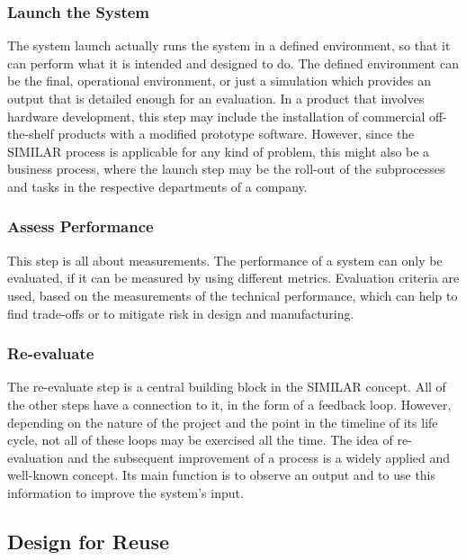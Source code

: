 \subsubsection{Launch the System}

\hspace{5mm} The system launch actually runs the system in a defined environment, so that it can perform what it is intended and designed to do.
The defined environment can be the final, operational environment, or just a simulation which provides an output that is detailed enough for an evaluation.
In a product that involves hardware development, this step may include the installation of commercial off-the-shelf products with a modified prototype software.
However, since the SIMILAR process is applicable for any kind of problem, this might also be a business process, where the launch step may be the roll-out of the subprocesses and tasks in the respective departments of a company.

\subsubsection{Assess Performance}

\hspace{5mm} This step is all about measurements.
The performance of a system can only be evaluated, if it can be measured by using different metrics.
Evaluation criteria are used, based on the measurements of the technical performance, which can help to find trade-offs or to mitigate risk in design and manufacturing.

\subsubsection{Re-evaluate}

\hspace{5mm} The re-evaluate step is a central building block in the SIMILAR concept.
All of the other steps have a connection to it, in the form of a feedback loop.
However, depending on the nature of the project and the point in the timeline of its life cycle, not all of these loops may be exercised all the time.
The idea of re-evaluation and the subsequent improvement of a process is a widely applied and well-known concept.
Its main function is to observe an output and to use this information to improve the system's input.

\subsection{Design for Reuse}

